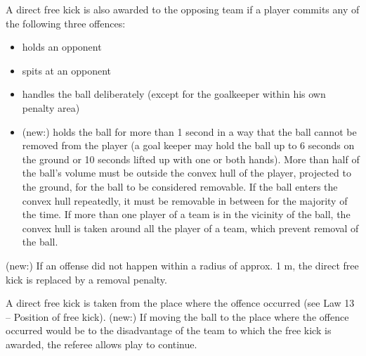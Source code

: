 
\bigskip

{\color{magenta}
A direct free kick is also awarded to the opposing team if a player commits any of the following three offences: 

\begin{itemize}
\item holds an opponent
\item spits at an opponent
\item handles the ball deliberately (except for the goalkeeper within his own penalty area)
\item (new:) holds the ball for more than 1 second in a way that the ball cannot be removed from the player (a goal keeper may hold the ball up to 6 seconds on the ground or 10 seconds lifted up with one or both hands). More than half of the ball's volume must be outside the convex hull of the player, projected to the ground, for the ball to be considered removable. If the ball enters the convex hull repeatedly, it must be removable in between for the majority of the time. If more than one player of a team is in the vicinity of the ball, the convex hull is taken around all the player of a team, which prevent removal of the ball.
\end{itemize}

\bigskip

(new:) If an offense did not happen within a radius of approx. 1 m, the direct free kick is replaced by a removal penalty.

\bigskip


A direct free kick is taken from the place where the offence occurred (see Law 13 -- Position of free kick). (new:) If moving the ball to the place where the offence occurred would be to the disadvantage of the team to which the free kick is awarded, the referee allows play to continue.
}



